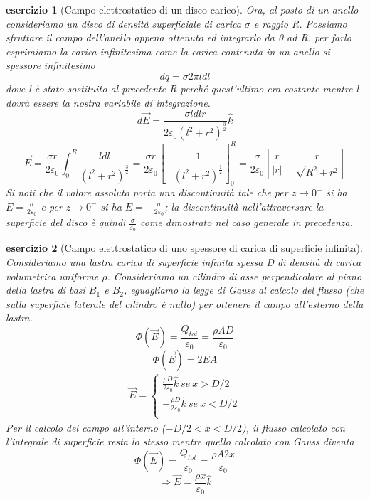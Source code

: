\documentclass[10pt,a4paper]{article}
\newtheorem{esercizio}{esercizio}
\begin{document}
\begin{esercizio}[Campo elettrostatico di un disco carico]
Ora, al posto di un anello consideriamo un disco di densità superficiale di carica $\sigma$ e raggio R. Possiamo sfruttare il campo dell'anello appena ottenuto ed integrarlo da 0 ad R. per farlo esprimiamo la carica infinitesima come la carica contenuta in un anello si spessore infinitesimo
\[dq = \sigma 2\pi l dl\]
dove l è stato sostituito al precedente R perché quest'ultimo era costante mentre l dovrà essere la nostra variabile di integrazione. 
\[d\vec{E} = \frac{  \sigma l dl r }{2\varepsilon_0 (l^2+r^2)^{\frac{3}{2}}}\hat{k}\]
\[\vec{E} = \frac{\sigma r}{2\varepsilon_0}\int_{0}^{R}\frac{ldl}{(l^2+r^2)^{\frac{3}{2}}} = \frac{\sigma r}{2\varepsilon_0}\left[-\frac{1}{(l^2+r^2)^{\frac{1}{2}}}\right]^R_0 = \frac{\sigma }{2\varepsilon_0}\left[\frac{r}{|r|}-\frac{r}{\sqrt{R^2+r^2}}\right]\]
Si noti che il valore assoluto porta una discontinuità tale che per \(z\to0^+\) si ha \(E = \frac{\sigma}{2\varepsilon_0}\) e per \(z\to0^-\) si ha \(E = -\frac{\sigma}{2\varepsilon_0}\); la discontinuità nell'attraversare la superficie del disco è quindi \(\frac{\sigma}{\varepsilon_0}\) come dimostrato nel caso generale in precedenza.
\end{esercizio}
\begin{esercizio}[Campo elettrostatico di uno spessore di carica di superficie infinita]
Consideriamo una lastra carica di superficie infinita spessa D di densità di carica volumetrica uniforme $\rho$. Consideriamo un cilindro di asse perpendicolare al piano della lastra di basi \(B_1\) e \(B_2\), eguagliamo la legge di Gauss al calcolo del flusso (che sulla superficie laterale del cilindro è nullo) per ottenere il campo all'esterno della lastra. 
\[\Phi(\vec{E}) = \frac{Q_{tot}}{\varepsilon_0} = \frac{\rho A D}{\varepsilon_0}\]
\[\Phi(\vec{E}) = 2EA\]
\begin{align*}
	\vec{E} =
	\begin{cases}
	\frac{\rho D}{2\varepsilon_0}\hat{k}\ se\ x>D/2\\
	-\frac{\rho D}{2\varepsilon_0}\hat{k}\ se\ x<D/2\\
	\end{cases}
\end{align*}
 Per il calcolo del campo all'interno (\(-D/2<x<D/2\)), il flusso calcolato con l'integrale di superficie resta lo stesso mentre quello calcolato con Gauss diventa
  \[\Phi(\vec{E}) = \frac{Q_{tot}}{\varepsilon_0} = \frac{\rho A 2x}{\varepsilon_0} \]
  \[\Rightarrow \vec{E} = \frac{\rho x}{\varepsilon_0}\hat{k}\]
\end{esercizio}
\end{document}
